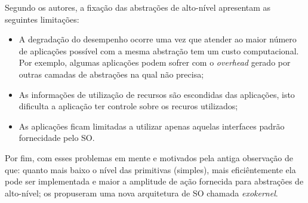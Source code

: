 Segundo os autores, a fixação das abstrações de alto-nível apresentam as
seguintes limitações:
\begin{itemize}
  \item A degradação do desempenho ocorre uma vez que atender ao maior número
        de aplicações possível com a mesma abstração tem um custo
        computacional. Por exemplo, algumas aplicações podem sofrer com o
        \emph{overhead} gerado por outras camadas de abstrações na qual não
        precisa;
  \item As informações de utilização de recursos são escondidas das aplicações,
        isto dificulta a aplicação ter controle sobre os recuros utilizados;
  \item As aplicações ficam limitadas a utilizar apenas aquelas interfaces
        padrão fornecidade pelo SO.
\end{itemize}
Por fim, com esses problemas em mente e motivados pela antiga observação de que:
quanto mais baixo o nível das primitivas (simples), mais eficiêntemente ela
pode ser implementada e maior a amplitude de ação fornecida para abstrações de
alto-nível; os propuseram uma nova arquitetura de SO chamada \emph{exokernel}.

